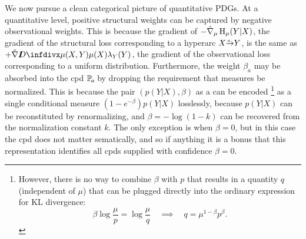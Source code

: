 We now pursue a clean categorical picture of quantitative PDGs.
At a quantitative level, positive structural weights can be captured by negative observational weights.
This is because the gradient of $-\hat\nabla_\mu \operatorname{\mathrm{H}}_\mu(Y|X)$, the gradient of the structural loss corresponding to a hyperarc $\ed aXY$, is the same as $+\hat\nabla\kldiv{\mu(X,Y)}{\mu(X) \lambda_Y(Y)}$, the gradient of the observational loss corresponding to a uniform distribution.
Furthermore, the weight $\beta_a$ may be absorbed into the cpd $\p_a$ by  dropping the requirement that measures be normalized. 
This is because the pair $(p(Y|X), \beta)$ as a
can be encoded
\unskip\footnote{%
However, there is no way 
to combine $\beta$ with $p$ that results in a quantity $q$ (independent of $\mu$) that can be plugged directly into the ordinary expression for KL divergence:
\[
    \beta \log \frac \mu p = \log \frac \mu q \quad\implies\quad
        q = \mu^{1-\beta}p^\beta.
\]
}
as a single conditional measure
$
    (1-e^{-\beta}) p(Y|X)
$
losslessly, because $p(Y|X)$ can be reconstituted by renormalizing, and $\beta = - \log (1-k)$ can be recovered from the normalization constant $k$.
The only exception is when $\beta=0$, but in this case the cpd does not matter sematically, and so if anything it is a bonus that this representation identifies all cpds supplied with confidence $\beta=0$.

